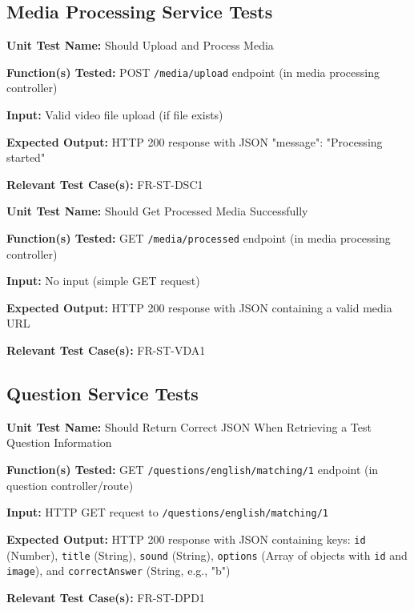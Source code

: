\documentclass[12pt, titlepage]{article}
\begin{document}
\subsection*{Media Processing Service Tests}

\begin{mdframed}[linewidth=0.5mm]
\textbf{Unit Test Name:} Should Upload and Process Media \par
\textbf{Function(s) Tested:} POST \texttt{/media/upload} endpoint (in media processing controller) \par
\textbf{Input:} Valid video file upload (if file exists) \par
\textbf{Expected Output:} HTTP 200 response with JSON {"message": "Processing started"} \par
\textbf{Relevant Test Case(s):} FR-ST-DSC1
\end{mdframed}

\begin{mdframed}[linewidth=0.5mm]
\textbf{Unit Test Name:} Should Get Processed Media Successfully \par
\textbf{Function(s) Tested:} GET \texttt{/media/processed} endpoint (in media processing controller) \par
\textbf{Input:} No input (simple GET request) \par
\textbf{Expected Output:} HTTP 200 response with JSON containing a valid media URL \par
\textbf{Relevant Test Case(s):} FR-ST-VDA1
\end{mdframed}

\subsection*{Question Service Tests}

\begin{mdframed}[linewidth=0.5mm]
\textbf{Unit Test Name:} Should Return Correct JSON When Retrieving a Test Question Information \par
\textbf{Function(s) Tested:} GET \texttt{/questions/english/matching/1} endpoint (in question controller/route) \par
\textbf{Input:} HTTP GET request to \texttt{/questions/english/matching/1} \par
\textbf{Expected Output:} HTTP 200 response with JSON containing keys: \texttt{id} (Number), \texttt{title} (String), \texttt{sound} (String), \texttt{options} (Array of objects with \texttt{id} and \texttt{image}), and \texttt{correctAnswer} (String, e.g., "b") \par
\textbf{Relevant Test Case(s):} FR-ST-DPD1
\end{mdframed}
\end{document}
